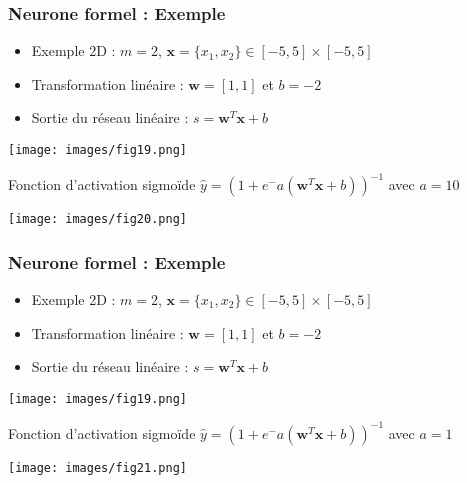 \documentclass[9pt]{beamer}
\newcommand \ve[1]{\mathbf{#1}}
\begin{document}
\begin{frame}
\frametitle {Neurone formel : Exemple}

\begin{minipage}[c]{0.7\linewidth}
\begin{itemize}
\item Exemple 2D : $m=2$, $\ve{x}=\{x_1, x_2\}\in[-5,5]\times[-5,5]$
\item Transformation linéaire : $\ve{w}=[1,1]$ et $b=-2$
\item Sortie du réseau linéaire : $s=\ve{w}^T\ve{x}+b$
\end{itemize}
\end{minipage} \hfill
\begin{minipage}[l]{0.25\linewidth}
\texttt{[image: images/fig19.png]}
\end{minipage}
\begin{block}{
Fonction d'activation sigmoïde $\hat{y}=\left(1+e^-a{\left(\ve{w}^T\ve{x}+b\right)}\right)^{-1}$ avec $a=10$}

\begin{center}
\texttt{[image: images/fig20.png]}
\end{center}
\end{block}
\end{frame}

\begin{frame}
\frametitle {Neurone formel : Exemple}

\begin{minipage}[c]{0.7\linewidth}
\begin{itemize}
\item Exemple 2D : $m=2$, $\ve{x}=\{x_1, x_2\}\in[-5,5]\times[-5,5]$
\item Transformation linéaire : $\ve{w}=[1,1]$ et $b=-2$
\item Sortie du réseau linéaire : $s=\ve{w}^T\ve{x}+b$
\end{itemize}
\end{minipage} \hfill
\begin{minipage}[l]{0.25\linewidth}
\texttt{[image: images/fig19.png]}
\end{minipage}
\begin{block}{
Fonction d'activation sigmoïde $\hat{y}=\left(1+e^-a{\left(\ve{w}^T\ve{x}+b\right)}\right)^{-1}$ avec $a=1$}

\begin{center}
\texttt{[image: images/fig21.png]}
\end{center}
\end{block}
\end{frame}
\end{document}
